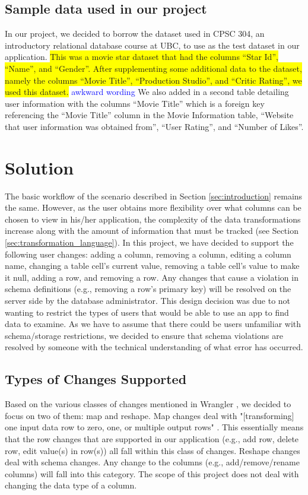 \documentclass[12pt]{article}
\newcommand{\hilight}[1]{\colorbox{yellow}{#1}}
\begin{document}
\subsection{Sample data used in our project}
In our project, we decided to borrow the dataset used in CPSC 304, an introductory relational database course at UBC, to use as the test dataset in our application. \hilight{This was a movie star dataset that had the columns ``Star Id'', ``Name'', and ``Gender''. After supplementing some additional data to the dataset, namely the columns ``Movie Title'', ``Production Studio'', and ``Critic Rating'', we used this dataset.} \textcolor{blue} {awkward wording} We also added in a second table detailing user information with the columns ``Movie Title'' which is a foreign key referencing the ``Movie Title'' column in the Movie Information table, ``Website that user information was obtained from'', ``User Rating'', and ``Number of Likes''.

\section{Solution}
The basic workflow of the scenario described in Section \ref{sec:introduction} remains the same. However, as the user obtains more flexibility over what columns can be chosen to view in his/her application,  the complexity of the data transformations increase along with the amount of information that must be tracked (see Section \ref{sec:transformation_language}). In this project, we have decided to support the following user changes: adding a column, removing a column, editing a column name, changing a table cell's current value, removing a table cell's value to make it null, adding a row, and removing a row. Any changes that cause a violation in schema definitions (e.g., removing a row's primary key) will be resolved on the server side by the database administrator. This design decision was due to not wanting to restrict the types of users that would be able to use an app to find data to examine. As we have to assume that there could be users unfamiliar with schema/storage restrictions, we decided to ensure that schema violations are resolved by someone with the technical understanding of what error has occurred. 

\subsection{Types of Changes Supported}
\label{sec:types_of_changes}
Based on the various classes of changes mentioned in Wrangler \cite{kandel2011wrangler}, we decided to focus on two of them: map and reshape. Map changes deal with "[transforming] one input data row to zero, one, or multiple output rows" \cite{kandel2011wrangler}. This essentially means that the row changes that are supported in our application (e.g., add row, delete row, edit value(s) in row(s)) all fall within this class of changes. Reshape changes deal with schema changes. Any change to the columns (e.g., add/remove/rename columns) will fall into this category. The scope of this project does not deal with changing the data type of a column.
\end{document}
